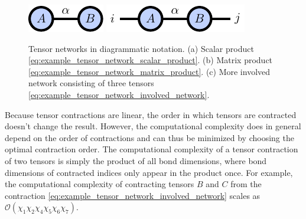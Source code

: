 \begin{figure}[h]
	\centering
	\subcaptionbox{\label{fig:basic_tensor_networks_matrix_vector_product}}
	{%
		\raisebox{\dimexpr.5\ht\largestimage-.5\height}
		{%
			\includegraphics[scale=1]{figures/tikz/Tensor_Networks/basic_networks/basic_networks_a.pdf}
		}
	}
\subcaptionbox{\label{fig:basic_tensor_networks_matrix_product}}
	{%
		\raisebox{\dimexpr.5\ht\largestimage-.5\height}
		{%
			\includegraphics[scale=1]{figures/tikz/Tensor_Networks/basic_networks/basic_networks_b.pdf}
		}
	}
\subcaptionbox{\label{fig:basic_tensor_networks_involved_contraction}}
	{%
		\usebox{\largestimage}
	}
	\caption{Tensor networks in diagrammatic notation. (a) Scalar product \eqref{eq:example_tensor_network_scalar_product}. (b) Matrix product \eqref{eq:example_tensor_network_matrix_product}. (c) More involved network consisting of three tensors \eqref{eq:example_tensor_network_involved_network}.}
	\label{fig:basic_tensor_network_diagrams}
\end{figure}
Because tensor contractions are linear, the order in which tensors are contracted doesn't change the result. However, the computational complexity does in general depend on the order of contractions and can thus be minimized by choosing the optimal contraction order. The computational complexity of a tensor contraction of two tensors is simply the product of all bond dimensions, where bond dimensions of contracted indices only appear in the product once. For example, the computational complexity of contracting tensors $B$ and $C$ from the contraction \eqref{eq:example_tensor_network_involved_network} scales as $\mathcal{O}(\chi_1\chi_2\chi_4\chi_5\chi_6\chi_7)$. \par
